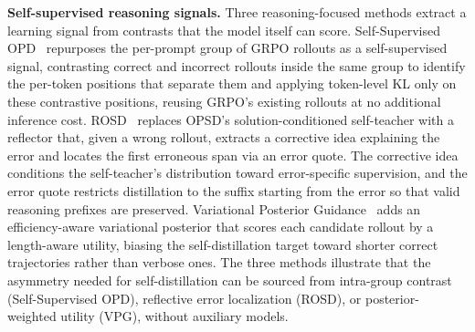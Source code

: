 \documentclass{article} %
\begin{document}
\textbf{Self-supervised reasoning signals.} Three reasoning-focused methods extract a learning signal from contrasts that the model itself can score. Self-Supervised OPD~\citep{2605.17497} repurposes the per-prompt group of GRPO rollouts as a self-supervised signal, contrasting correct and incorrect rollouts inside the same group to identify the per-token positions that separate them and applying token-level KL only on these contrastive positions, reusing GRPO's existing rollouts at no additional inference cost. ROSD~\citep{2605.28014} replaces OPSD's solution-conditioned self-teacher with a reflector that, given a wrong rollout, extracts a corrective idea explaining the error and locates the first erroneous span via an error quote. The corrective idea conditions the self-teacher's distribution toward error-specific supervision, and the error quote restricts distillation to the suffix starting from the error so that valid reasoning prefixes are preserved. Variational Posterior Guidance~\citep{2605.11019} adds an efficiency-aware variational posterior that scores each candidate rollout by a length-aware utility, biasing the self-distillation target toward shorter correct trajectories rather than verbose ones. The three methods illustrate that the asymmetry needed for self-distillation can be sourced from intra-group contrast (Self-Supervised OPD), reflective error localization (ROSD), or posterior-weighted utility (VPG), without auxiliary models.
\end{document}
